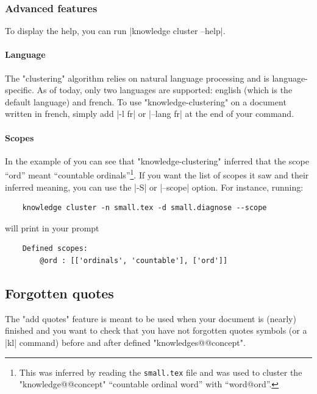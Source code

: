 \documentclass{article}
\begin{document}
\subsubsection{Advanced features}

To display the help, you can run \spverb|knowledge cluster --help|.

\paragraph{Language} The "clustering" algorithm relies on natural language 
processing and is language-specific. As of today, only two languages
are supported: english (which is the default language) and french.
To use "knowledge-clustering" on a document written in french,
simply add \spverb|-l fr| or \spverb|--lang fr| at the end of your command.


\paragraph{Scopes} In the example of
you can see that "knowledge-cluste\-ring" inferred that the
scope ``ord'' meant ``countable ordinals''\footnote{This was inferred
by reading the \texttt{small.tex} file and was used to cluster
the "knowledge@@concept" ``countable ordinal word'' with ``word@ord''.}.
If you want the list of scopes it saw
and their inferred meaning, you can use the \spverb|-S| or \spverb|--scope| 
option. 
For instance, running:
\begin{verbatim}
    knowledge cluster -n small.tex -d small.diagnose --scope
\end{verbatim}
will print in your prompt
\begin{verbatim}
    Defined scopes:
	    @ord : [['ordinals', 'countable'], ['ord']]
\end{verbatim}


\subsection{Forgotten quotes}


The "add quotes" feature is meant to be used when your document is (nearly)
finished and you want to check that you have not forgotten quotes symbols
(or a \spverb|kl{}| command) before and after defined "knowledges@@concept".
\end{document}
